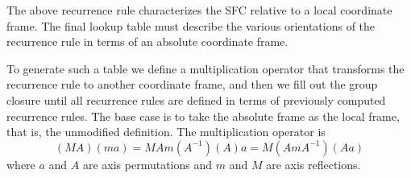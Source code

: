 The above recurrence rule characterizes the SFC relative to a local coordinate frame. The final lookup table must describe the various orientations of the recurrence rule in terms of an absolute coordinate frame.

To generate such a table we define a multiplication operator that transforms the recurrence rule to another coordinate frame, and then we fill out the group closure until all recurrence rules are defined in terms of previously computed recurrence rules. The base case is to take the absolute frame as the local frame, that is, the unmodified definition. The multiplication operator is
\begin{equation*}
  (MA)(ma) = MAm(A^{-1})(A)a = M(AmA^{-1})(Aa)
\end{equation*}
where $a$ and $A$ are axis permutations and $m$ and $M$ are axis reflections.